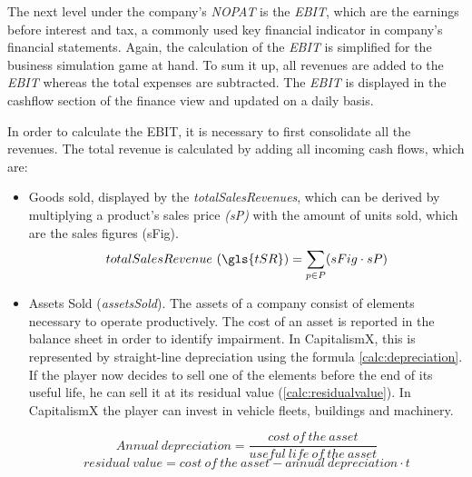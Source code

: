 The next level under the company's \textit{NOPAT} is the \textit{EBIT}, which are the earnings before interest and tax, a commonly used key financial indicator in company's financial statements. \cite{lee_e_2006} Again, the calculation of the \textit{EBIT} is simplified for the business simulation game at hand. To sum it up, all revenues are added to the \textit{EBIT} whereas the total expenses are subtracted. The \textit{EBIT} is displayed in the cashflow section of the finance view and updated on a daily basis.

In order to calculate the EBIT, it is necessary to first consolidate all the revenues. The total revenue is calculated by adding all incoming cash flows, which are:
\begin{itemize}
    \item Goods sold, displayed by the \textit{totalSalesRevenues}, which can be derived by multiplying a product’s sales price \textit{(sP)} with the amount of units sold, which are the sales figures (\gls{sFig}). 
    \begin{equation}
        totalSalesRevenue~(\gls{tSR}) = \sum_{p \in P}(sFig \cdot sP) 
    \end{equation}
    \item Assets Sold (\textit{assetsSold}). The assets of a company consist of elements necessary to operate productively. The cost of an asset is reported in the balance sheet in order to identify impairment. In CapitalismX, this is represented by straight-line depreciation using the formula \ref{calc:depreciation}. If the player now decides to sell one of the elements before the end of its useful life, he can sell it at its residual value (\ref{calc:residualvalue}). In CapitalismX the player can invest in vehicle fleets, buildings and machinery.
    
    \begin{equation}
     \label{calc:depreciation}
     Annual \ depreciation = {\frac{cost \ of \ the \ asset}{useful \ life \ of \ the \ asset}}
    \end{equation}
     \begin{equation}
     \label{calc:residualvalue}
     residual \ value = {{cost \ of \ the \ asset} - {annual \ depreciation \cdot t }}    
     \end{equation}
     

\end{itemize}
